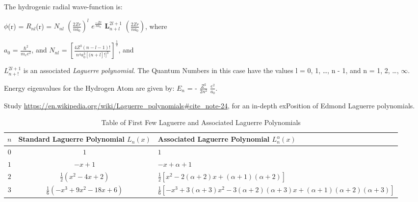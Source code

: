 \documentclass[a4paper, 10pt, onepage]{elegantbook}
\begin{document}
{The hydrogenic radial wave-function is:  

$\phi$(r) = $R_{nl}$(r) = $N_{nl}$ $(\frac{2Zr}{na_0})^l$ $e^{\frac{-Zr}{na_0}}$ $\mathbf{\textbf{L}}^{2l + 1}_{n + l}$ 
$(\frac{2Zr}{na_0})$, where   

$a_0$ = $\frac{\hbar^2}{m_e e^2}$, and $N_{nl}$ = $\left[\frac{4Z^3(n - l - 1)!}{n^4a^3_0[(n + l]!]^3} 
\right]^\frac{1}{2}$, and 

$L^{2l + 1}_{n + !}$ is an associated \emph{Laguerre polynomial}. The Quantum Numbers in this case have the values l = 
0, 1, \ldots, n - 1, and n = 1, 2, \ldots, $\infty$.  

Energy eigenvalues for the Hydrogen Atom are given by: $E_n$ = - $\frac{Z^2}{2n^2}$ $\frac{e^2}{a_0}$.  

Study \url{https://en.wikipedia.org/wiki/Laguerre_polynomials#cite_note-24}, for an in-depth exPosition of Edmond 
Laguerre polynomials.



\begin{table}[htbp]
\centering
\caption{Table of First Few Laguerre and Associated Laguerre Polynomials}
\label{tab:laguerre_polynomials}
\begin{tabular}{ccl}
\toprule
$n$ & Standard Laguerre Polynomial $L_n(x)$ & Associated Laguerre Polynomial $L_n^\alpha(x)$ \\
\midrule
$0$ & $1$ & $1$ \\
\addlinespace
$1$ & $-x + 1$ & $-x + \alpha + 1$ \\
\addlinespace
$2$ & $\frac{1}{2}(x^2 - 4x + 2)$ & $\frac{1}{2}\left[x^2 - 2(\alpha + 2)x + (\alpha + 1)(\alpha + 2)\right]$ \\
\addlinespace
$3$ & $\frac{1}{6}(-x^3 + 9x^2 - 18x + 6)$ & $\frac{1}{6}\left[-x^3 + 3(\alpha + 3)x^2 - 3(\alpha + 2)(\alpha + 3)x + 
(\alpha + 1)(\alpha + 2)(\alpha + 3)\right]$ \\
\bottomrule
\end{tabular}
\end{table}


}
\end{document}
